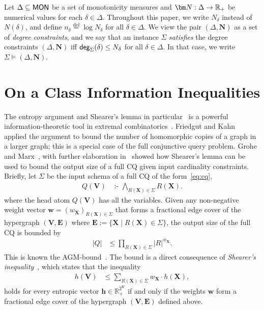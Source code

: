 \documentclass{theoretics}
\newcommand{\degree}{\text{\sf deg}}
\newcommand{\defeq}{\stackrel{\text{def}}{=}}
\newcommand{\R}{\mathbb R} %
\newcommand{\Rp}{{\mathbb R}_{\tiny +}} %
\newcommand{\cd}{\text{ :- }}
\newcommand{\mon}{\text{\sf MON}}
\begin{document}
Let $\Delta\subseteq\mon$ be a set of monotonicity measures and
$\bm N:\Delta \rightarrow \Rp$ be numerical values for each
$\delta \in\Delta$. Throughout this paper, we write $N_\delta$ instead of $N(\delta)$, and
define $n_\delta \defeq \log N_\delta$ for all $\delta \in\Delta$.  We
view the pair $(\Delta, \bm N)$ as a set of {\em degree constraints},
and we say that an instance $\Sigma$ {\em
  satisfies} the degree constraints $(\Delta, \bm N)$ iff
$\degree_{\Sigma}(\delta) \leq N_\delta$ for all
$\delta \in \Delta$.  In that case, we write~$\Sigma \models (\Delta, \bm N)$.


\section{On a Class Information Inequalities}
\label{sec:info:inequality}

The entropy argument and Shearer's lemma in particular~\cite{MR859293} is a powerful
information-theoretic tool in extremal combinatorics~\cite{entropy-counting}. Friedgut and
Kahn~\cite{MR1639767} applied the argument to bound the number of homomorphic
copies of a graph
in a larger graph; this is a special case of the full conjunctive query problem.
Grohe and Marx~\cite{DBLP:conf/soda/GroheM06}, with further elaboration
in~\cite{DBLP:conf/focs/AtseriasGM08}
showed how Shearer's lemma can be used to bound the output size of a full CQ given input
cardinality constraints.
Briefly, let $\Sigma$ be the input schema of a full CQ of the form~\eqref{eq:cq},
\begin{align}
    Q(\bm V) &\cd  \bigwedge_{R(\bm X)\in \Sigma}R(\bm X). \label{eq:full:cq}
\end{align}
where the head atom $Q(\bm V)$ has all the variables.
Given any non-negative weight vector
$\bm w = (w_{\bm X})_{R(\bm X)\in \Sigma}$
that forms a fractional edge cover of the hypergraph $(\bm V, \bm E)$ where $\bm E := \{\bm X \mid R(\bm
X)\in \Sigma\}$,
the output size of the full CQ is bounded by
\begin{align}
    |Q| &\leq \prod_{R(\bm X)\in \Sigma} |R|^{w_{\bm X}}.
    \label{eqn:agm}
\end{align}
This is known the AGM-bound~\cite{DBLP:journals/siamcomp/AtseriasGM13}.
The bound is a direct consequence of {\em Shearer's inequality}~\cite{MR859293}, which states
that the inequality
\begin{align}
    h(\bm V) &\leq  \sum_{R(\bm X)\in \Sigma} w_{\bm X} \cdot h(\bm X), \label{eqn:shearer}
\end{align}
holds for every entropic vector $\bm h \in \R_+^{2^{\bm V}}$ if and only if the weights $\bm w$
form a fractional edge cover of the hypergraph $(\bm V, \bm E)$ defined above.
\end{document}
